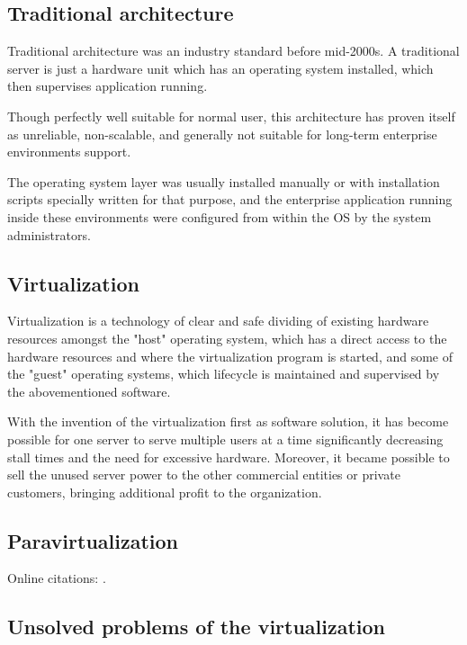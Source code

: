 \subsection{Traditional architecture}

Traditional architecture was an industry standard before mid-2000s.
A traditional server is just a hardware unit which has an operating system installed,
which then supervises application running.

Though perfectly well suitable for normal user, this architecture has proven itself as unreliable, non-scalable,
and generally not suitable for long-term enterprise environments support.

The operating system layer was usually installed manually or with installation scripts specially written for that purpose,
and the enterprise application running inside these environments were configured from within the OS by the system administrators.

\subsection{Virtualization}
Virtualization is a technology of clear and safe dividing
of existing hardware resources amongst the "host" operating system,
which has a direct access to the hardware resources and where the virtualization program is started, and some of the "guest" operating systems,
which lifecycle is maintained and supervised by the abovementioned software.

With the invention of the virtualization first as software solution,
it has become possible for one server to serve multiple users at a time significantly decreasing stall times and the need for excessive hardware.
Moreover, it became possible to sell the unused
server power to the other commercial entities or private customers,
bringing additional profit to the organization.



\subsection{Paravirtualization}


Online citations: \cite{TUGInstmem, Thornburg01, CTANacmart}.



\subsection{Unsolved problems of the virtualization}


